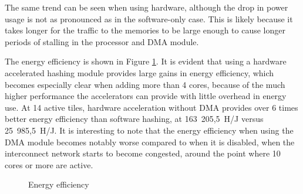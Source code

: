 The same trend can be seen when using hardware, although the drop in power usage is not as pronounced as in the software-only
case. This is likely because it takes longer for the traffic to the memories to be large enough to cause longer periods of
stalling in the processor and DMA module.

The energy efficiency is shown in Figure \ref{fig:efficiency-plot}. It is evident that using a hardware accelerated
hashing module provides large gains in energy efficiency, which becomes especially clear when adding more than 4 cores,
because of the much higher performance the accelerators can provide with little overhead in energy use. At 14 active
tiles, hardware acceleration without DMA provides over 6 times better energy efficiency than software hashing,
at 163~205,5~H/J versus 25~985,5~H/J.
It is interesting to note that the energy efficiency when using the DMA module becomes notably worse compared to when it is disabled, when the interconnect network starts to become congested, around the point where 10 cores or more are active.

\begin{figure}
	\centering
	\caption{Energy efficiency}
	\label{fig:efficiency-plot}
\end{figure}


